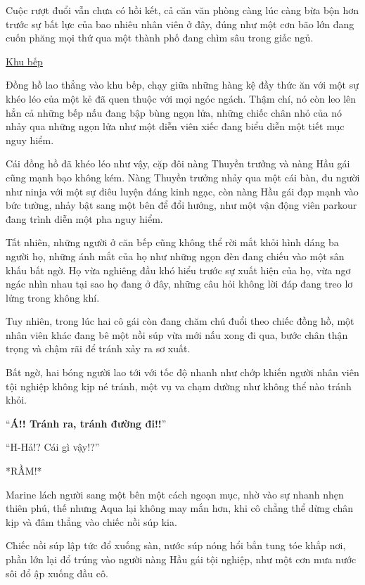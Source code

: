\documentclass[../main.tex]{subfiles}
\begin{document}
Cuộc rượt đuổi vẫn chưa có hồi kết, cả căn văn phòng càng lúc càng bừa bộn hơn trước sự bất lực của bao nhiêu nhân viên ở đây, đúng như một cơn bão lớn đang cuốn phăng mọi thứ qua một thành phố đang chìm sâu trong giấc ngủ.

\begin{center}
  \uline{Khu bếp}
\end{center}

Đồng hồ lao thẳng vào khu bếp, chạy giữa những hàng kệ đầy thức ăn với một sự khéo léo của một kẻ đã quen thuộc với mọi ngóc ngách. Thậm chí, nó còn leo lên hẳn cả những bếp nấu đang bập bùng ngọn lửa, những chiếc chân nhỏ của nó nhảy qua những ngọn lửa như một diễn viên xiếc đang biểu diễn một tiết mục nguy hiểm.

Cái đồng hồ đã khéo léo như vậy, cặp đôi nàng Thuyền trưởng và nàng Hầu gái cũng mạnh bạo không kém. Nàng Thuyền trưởng nhảy qua một cái bàn, đu người như ninja với một sự điêu luyện đáng kinh ngạc, còn nàng Hầu gái đạp mạnh vào bức tường, nhảy bật sang một bên để đổi hướng, như một vận động viên parkour đang trình diễn một pha nguy hiểm.

Tất nhiên, những người ở căn bếp cũng không thể rời mắt khỏi hình dáng ba người họ, những ánh mắt của họ như những ngọn đèn đang chiếu vào một sân khấu bất ngờ. Họ vừa nghiêng đầu khó hiểu trước sự xuất hiện của họ, vừa ngơ ngác nhìn nhau tại sao họ đang ở đây, những câu hỏi không lời đáp đang treo lơ lửng trong không khí.

Tuy nhiên, trong lúc hai cô gái còn đang chăm chú đuổi theo chiếc đồng hồ, một nhân viên khác đang bê một nồi súp vừa mới nấu xong đi qua, bước chân thận trọng và chậm rãi để tránh xảy ra sơ xuất.

Bất ngờ, hai bóng người lao tới với tốc độ nhanh như chớp khiến người nhân viên tội nghiệp không kịp né tránh, một vụ va chạm dường như không thể nào tránh khỏi.

``\textbf{Á!! Tránh ra, tránh đường đi!!}''

``H-Hả!? Cái gì vậy!?''

*RẦM!*

Marine lách người sang một bên một cách ngoạn mục, nhờ vào sự nhanh nhẹn thiên phú, thế nhưng Aqua lại không may mắn hơn, khi cô chẳng thể dừng chân kịp và đâm thẳng vào chiếc nồi súp kia.

Chiếc nồi súp lập tức đổ xuống sàn, nước súp nóng hổi bắn tung tóe khắp nơi, phần lớn lại đổ trúng vào người nàng Hầu gái tội nghiệp, như một cơn mưa nước sôi đổ ập xuống đầu cô.
\end{document}
